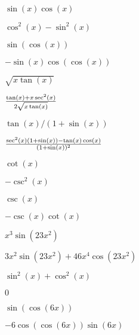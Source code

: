 \begin{exercises}
\begin{exercise} $\sin (x)\cos(x)$
\begin{answer} $\cos^2(x)-\sin^2(x)$
\end{answer}\end{exercise}

\begin{exercise} $\sin(\cos(x))$
\begin{answer} $-\sin(x)\cos(\cos(x))$
\end{answer}\end{exercise}

\begin{exercise} $\sqrt{x\tan(x)}$
\begin{answer} ${\tan(x)+x\sec^2(x)\over2\sqrt{x\tan(x)}}$
\end{answer}\end{exercise}

\begin{exercise} $\tan(x)/(1+\sin(x))$
\begin{answer} ${\sec^2(x)(1+\sin(x))-\tan(x) \cos(x)\over (1+\sin(x))^2}$
\end{answer}\end{exercise}

\begin{exercise} $\cot(x)$
\begin{answer} $ -\csc^2(x)$
\end{answer}\end{exercise}

\begin{exercise} $\csc(x)$
\begin{answer} $ -\csc(x)\cot(x)$
\end{answer}\end{exercise}

\begin{exercise} $x^3 \sin (23x^2 )$
\begin{answer} $3x^2\sin(23x^2)+46x^4\cos(23x^2)$
\end{answer}\end{exercise}

\begin{exercise} $\sin ^2(x) + \cos ^2(x)$
 \begin{answer} $0$
\end{answer}\end{exercise}

\begin{exercise}  $\sin (\cos (6x) )$
 \begin{answer} $-6\cos(\cos(6x))\sin(6x)$
\end{answer}\end{exercise}


\end{exercises}
